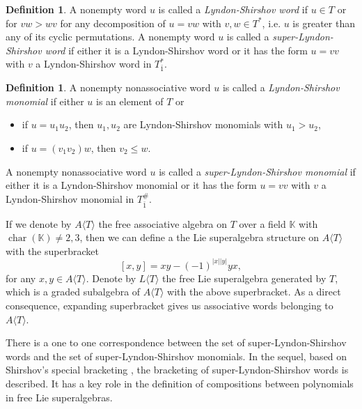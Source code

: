 \documentclass[reqno]{amsart}
\theoremstyle{definition}
\newtheorem{definition}[theorem]{Definition}
\theoremstyle{remark}
\numberwithin{equation}{section}
\DeclareMathOperator{\chr}{char}
\begin{document}
 \begin{definition}
A nonempty word $u$ is called a \emph{Lyndon-Shirshov word} if $u \in T$ or for $vw > wv$ for any decomposition of $u=vw$ with $v,w \in T^{\ast}$, i.e. $u$ is greater than any of its cyclic permutations. A nonempty word $u$ is called a \emph{super-Lyndon-Shirshov word} if either it is a Lyndon-Shirshov word or it has the form $u=vv$ with $v$ a Lyndon-Shirshov word in $T_{\bar{1}}^{\ast}$.
\end{definition}

\begin{definition}
A nonempty nonassociative word $u$ is called a \emph{Lyndon-Shirshov monomial} if  either $u$ is an element of $T$ or
\begin{itemize}
    \item [(i)] if $u=u_1u_2$, then $u_1 , u_2$ are Lyndon-Shirshov monomials with $u_1> u_2$,
    \item[(ii)] if $u=(v_1v_2)w$, then $v_2 \leq w$.
\end{itemize}
A nonempty nonassociative word $u$ is called a \emph{super-Lyndon-Shirshov monomial } if either it is a Lyndon-Shirshov monomial or it has the form $u=vv$ with $v$ a Lyndon-Shirshov monomial in $T_{\bar{1}}^{\#}$.
\end{definition}
If we denote by $A\langle T \rangle$ the free associative algebra on $T$ over a field $\mathbb{K}$ with $\chr(\mathbb{K})\neq 2,3$, then we can define a the Lie superalgebra structure on $A\langle T \rangle$ with the superbracket
\[ [x,y]= xy - (-1)^{|x| |y|} yx ,\]
for any $x,y \in A\langle T \rangle$.
Denote by $L \langle T \rangle $  the free Lie superalgebra generated by $T$, which is a graded subalgebra of $A\langle T \rangle$ with the above superbracket. As a direct consequence, expanding superbracket gives us associative words belonging to $ A\langle T \rangle$.

There is a one to one correspondence between the set of super-Lyndon-Shirshov words and the set of super-Lyndon-Shirshov monomials. In the sequel, based on Shirshov's special bracketing \cite{S1}, the bracketing of super-Lyndon-Shirshov words is described. It has a key role in the definition of compositions between polynomials in free Lie superalgebras.
\end{document}

